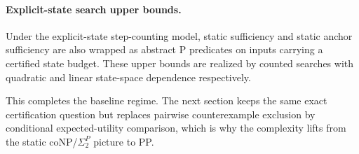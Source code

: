 \paragraph{Explicit-state search upper bounds.}
Under the explicit-state step-counting model, static sufficiency
and static anchor sufficiency are also wrapped as abstract \textsc{P}
predicates on inputs carrying a certified state budget. These upper bounds are
realized by counted searches with quadratic and linear state-space dependence
respectively. 

This completes the baseline regime. The next section keeps the same exact
certification question but replaces pairwise counterexample exclusion by
conditional expected-utility comparison, which is why the complexity lifts from
the static coNP/$\Sigma_2^P$ picture to PP.
